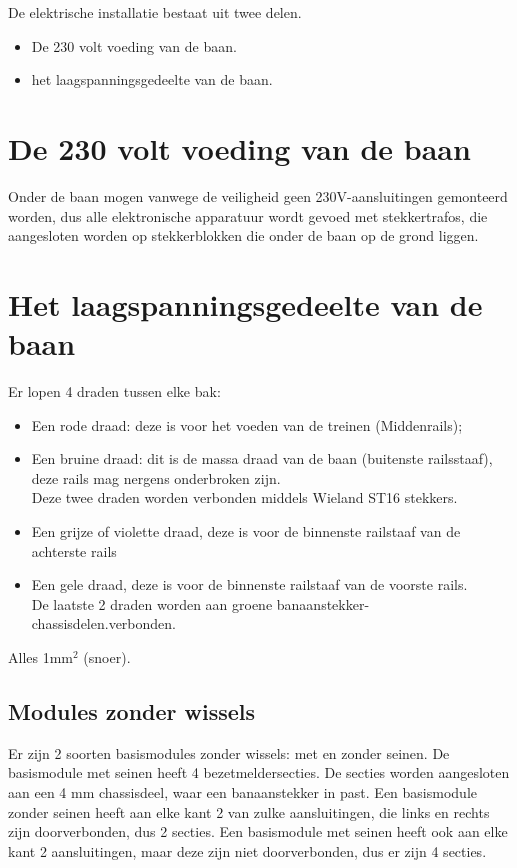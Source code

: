 \documentclass[12pt,a4paper]{report}
\begin{document}
De elektrische installatie bestaat uit twee delen.

\begin{itemize}
\item De 230 volt voeding van de baan.
\item het laagspanningsgedeelte van de baan.
\end{itemize}

\section{De 230 volt voeding van de baan}
Onder de baan mogen vanwege de veiligheid geen 230V-aansluitingen gemonteerd worden, dus alle elektronische apparatuur wordt gevoed met stekkertrafos, die aangesloten worden op stekkerblokken die onder de baan op de grond liggen.

\section{Het laagspanningsgedeelte van de baan}

Er lopen 4 draden tussen elke bak:
\begin{itemize}
\item Een rode draad: deze is voor het voeden van de treinen (Middenrails);
\item Een bruine draad: dit is de massa draad van de baan (buitenste railsstaaf), deze rails mag nergens onderbroken zijn.
\\
Deze twee draden worden verbonden middels Wieland ST16 stekkers.

\item Een grijze of violette draad, deze is voor de binnenste railstaaf van de achterste rails
\item Een gele draad, deze is voor de binnenste railstaaf van de voorste rails.\\
De laatste 2 draden worden aan groene banaanstekker-chassisdelen.verbonden.
\end{itemize}
Alles 1mm$^{2}$ (snoer). 

\subsection{Modules zonder wissels}
Er zijn 2 soorten basismodules zonder wissels: met en zonder seinen. De basismodule met seinen heeft 4 bezetmeldersecties.
De secties worden aangesloten aan een 4 mm chassisdeel, waar een banaanstekker in past.
Een basismodule zonder seinen heeft aan elke kant 2 van zulke aansluitingen, die links en rechts zijn doorverbonden, dus 2 secties.
Een basismodule met seinen heeft ook aan elke kant 2 aansluitingen, maar deze zijn niet doorverbonden, dus er zijn 4 secties.
\end{document}

